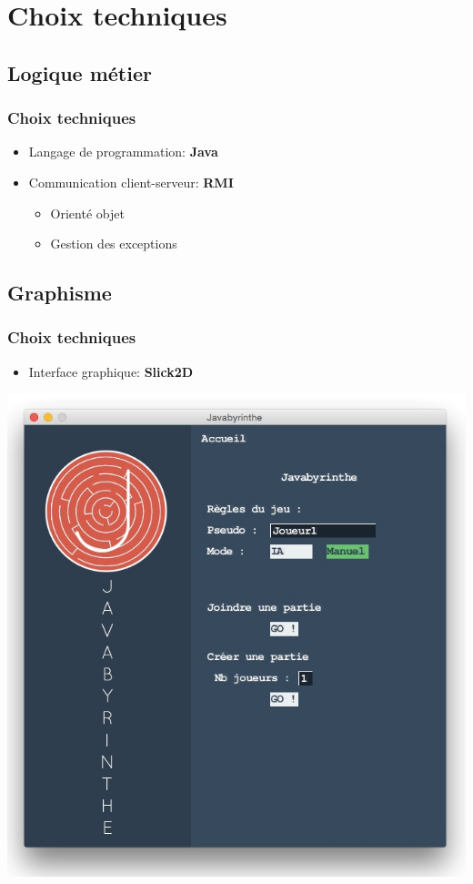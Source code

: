 \section{Choix techniques}

  \subsection{Logique métier}
    \begin{frame}
      \frametitle{Choix techniques}
      \begin{itemize}
        \item Langage de programmation: \textbf{Java} \vspace{1cm}
        \item Communication client-serveur: \textbf{RMI}
        \begin{itemize}
          \item Orienté objet
          \item Gestion des exceptions
        \end{itemize}
      \end{itemize}
    \end{frame}

  \subsection{Graphisme}
    \begin{frame}
      \frametitle{Choix techniques}
      \begin{itemize}
        \item Interface graphique: \textbf{Slick2D}
      \end{itemize}
      \begin{center}
        \includegraphics[scale=0.4]{image/menuJavabyrinthe.jpg}
      \end{center}
    \end{frame}
